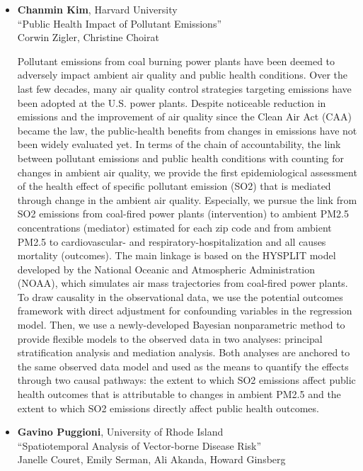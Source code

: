 \begin{itemize}
\item \textbf{Chanmin Kim}, Harvard University \\
``Public Health Impact of Pollutant Emissions'' \\
Corwin Zigler, Christine Choirat


Pollutant emissions from coal burning power plants have been deemed to adversely impact ambient air quality and public health conditions. Over the last few decades, many air quality control strategies targeting emissions have been adopted at the U.S. power plants. Despite noticeable reduction in emissions and the improvement of air quality since the Clean Air Act (CAA) became the law, the public-health benefits from changes in emissions have not been widely evaluated yet. In terms of the chain of accountability, the link between pollutant emissions and public health conditions with counting for changes in ambient air quality, we provide the first epidemiological assessment of the health effect of specific pollutant emission (SO2) that is mediated through change in the ambient air quality. Especially, we pursue the link from SO2 emissions from coal-fired power plants (intervention) to ambient PM2.5 concentrations (mediator) estimated for each zip code and from ambient PM2.5 to cardiovascular- and respiratory-hospitalization and all causes mortality (outcomes). The main linkage is based on the HYSPLIT model developed by the National Oceanic and Atmospheric Administration (NOAA), which simulates air mass trajectories from coal-fired power plants. To draw causality in the observational data, we use the potential outcomes framework with direct adjustment for confounding variables in the regression model. Then, we use a newly-developed Bayesian nonparametric method to provide flexible models to the observed data in two analyses: principal stratification analysis and mediation analysis. Both analyses are anchored to the same observed data model and used as the means to quantify the effects through two causal pathways: the extent to which SO2 emissions affect public health outcomes that is attributable to changes in ambient PM2.5 and the extent to which SO2 emissions directly affect public health outcomes.

\item \textbf{Gavino Puggioni}, University of Rhode Island \\
``Spatiotemporal Analysis of Vector-borne Disease Risk'' \\
Janelle Couret, Emily Serman, Ali Akanda, Howard Ginsberg



\end{itemize}
